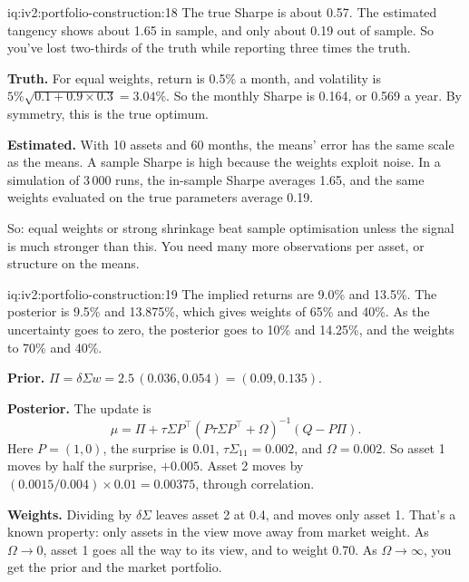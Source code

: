 \begin{solution}{iq:iv2:portfolio-construction:18}
The true Sharpe is about 0.57. The estimated tangency shows about 1.65 in sample, and only about 0.19 out of sample. So you've lost two-thirds of the truth while reporting three times the truth.

\textbf{Truth.} For equal weights, return is 0.5\% a month, and volatility is $5\%\sqrt{0.1 + 0.9 \times 0.3} = 3.04\%$. So the monthly Sharpe is 0.164, or 0.569 a year. By symmetry, this is the true optimum.

\textbf{Estimated.} With 10 assets and 60 months, the means' error has the same scale as the means. A sample Sharpe is high because the weights exploit noise. In a simulation of 3\,000 runs, the in-sample Sharpe averages 1.65, and the same weights evaluated on the true parameters average 0.19.

So: equal weights or strong shrinkage beat sample optimisation unless the signal is much stronger than this. You need many more observations per asset, or structure on the means.

\end{solution}

\begin{solution}{iq:iv2:portfolio-construction:19}
The implied returns are 9.0\% and 13.5\%. The posterior is 9.5\% and 13.875\%, which gives weights of 65\% and 40\%. As the uncertainty goes to zero, the posterior goes to 10\% and 14.25\%, and the weights to 70\% and 40\%.

\textbf{Prior.} $\Pi = \delta\Sigma w = 2.5\,(0.036, 0.054) = (0.09, 0.135)$.

\textbf{Posterior.} The update is
\[
\mu = \Pi + \tau\Sigma P^\top(P\tau\Sigma P^\top + \Omega)^{-1}(Q - P\Pi).
\]
Here $P = (1, 0)$, the surprise is $0.01$, $\tau\Sigma_{11} = 0.002$, and $\Omega = 0.002$. So asset 1 moves by half the surprise, $+0.005$. Asset 2 moves by $(0.0015/0.004) \times 0.01 = 0.00375$, through correlation.

\textbf{Weights.} Dividing by $\delta\Sigma$ leaves asset 2 at 0.4, and moves only asset 1. That's a known property: only assets in the view move away from market weight. As $\Omega \to 0$, asset 1 goes all the way to its view, and to weight 0.70. As $\Omega \to \infty$, you get the prior and the market portfolio.

\end{solution}

